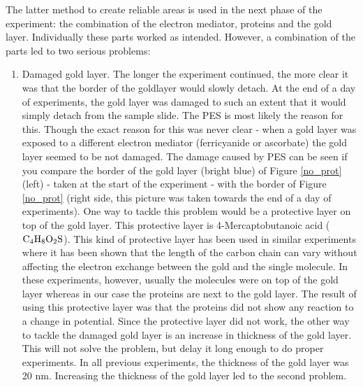 \documentclass[twoside,single]{lion-msc}
\begin{document}
The latter method to create reliable areas is used in the next phase of the experiment: the combination of the electron mediator, proteins and the gold layer. Individually these parts worked as intended. However, a combination of the parts led to two serious problems:
\begin{enumerate}


\item Damaged gold layer.
The longer the experiment continued, the more clear it was that the border of the goldlayer would slowly detach. At the end of a day of experiments, the gold layer was damaged to such an extent that it would simply detach from the sample slide. The PES is most likely the reason for this. Though the exact reason for this was never clear - when a gold layer was exposed to a different electron mediator (ferricyanide or ascorbate) the gold layer seemed to be not damaged. The damage caused by PES can be seen if you compare the border of the gold layer (bright blue) of Figure \ref{no_prot} (left) - taken at the start of the experiment -  with the border of Figure \ref{no_prot} (right side, this picture was taken towards the end of a day of experiments). One way to tackle this problem would be a protective layer on top of the gold layer. This protective layer is 4-Mercaptobutanoic acid ($\textup{C}_{4}\textup{H}_{8}\textup{O}_{2}\textup{S}$). This kind of protective layer has been used in similar experiments \cite{Elmalk2012} where it has been shown that the length of the carbon chain can vary without affecting the electron exchange between the gold and the single molecule. In these experiments, however, usually the molecules were on top of the gold layer whereas in our case the proteins are next to the gold layer. The result of using this protective layer was that the proteins did not show any reaction to a change in potential. Since the protective layer did not work, the other way to tackle the damaged gold layer is an increase in thickness of the gold layer. This will not solve the problem, but delay it long enough to do proper experiments. In all previous experiments, the thickness of the gold layer was 20 nm. Increasing the thickness of the gold layer led to the second problem.



\end{enumerate}
\end{document}

